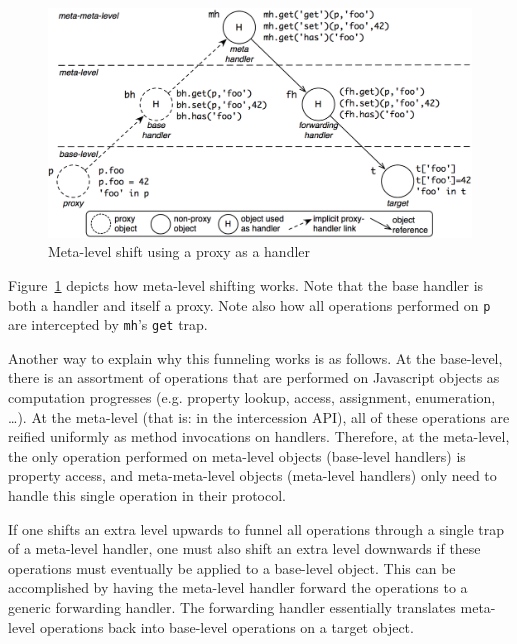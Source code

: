 \documentclass{sig-alternate}
\begin{document}

\begin{figure}[htbp]
  \centering
    \includegraphics[width=1.0\columnwidth]{MetaLevelShifting.png}
  \caption{Meta-level shift using a proxy as a handler}
  \label{fig:shift}
\end{figure}

Figure~\ref{fig:shift} depicts how meta-level shifting works. Note that the base handler is both a handler and itself a proxy. Note also how all operations performed on \texttt{p} are intercepted by \texttt{mh}'s \texttt{get} trap.

Another way to explain why this funneling works is as follows. At the base-level, there is an assortment of operations that are performed on Javascript objects as computation progresses (e.g. property lookup, access, assignment, enumeration, \ldots). At the meta-level (that is: in the intercession API), all of these operations are reified uniformly as method invocations on handlers. Therefore, at the meta-level, the only operation performed on meta-level objects (base-level handlers) is property access, and meta-meta-level objects (meta-level handlers) only need to handle this single operation in their protocol.

If one shifts an extra level upwards to funnel all operations through a single trap of a meta-level handler, one must also shift an extra level downwards if these operations must eventually be applied to a base-level object. This can be accomplished by having the meta-level handler forward the operations to a generic forwarding handler. The forwarding handler essentially translates meta-level operations back into base-level operations on a target object.
\end{document}
